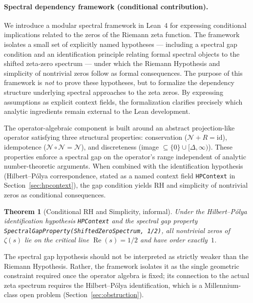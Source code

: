 \documentclass[12pt, a4paper]{article}
\theoremstyle{plain}
\newtheorem{theorem}{Theorem}[section]
\theoremstyle{definition}
\newcommand{\re}{\operatorname{Re}}
\newcommand{\lean}[1]{\texttt{#1}}
\newcommand{\Lean}{\textsf{Lean~4}}
\begin{document}
\paragraph{Spectral dependency framework (conditional contribution).}
We introduce a modular spectral framework in \Lean{} for expressing conditional
implications related to the zeros of the Riemann zeta function.
The framework isolates a small set of explicitly named hypotheses --- including a
spectral gap condition and an identification principle relating formal spectral
objects to the shifted zeta-zero spectrum --- under which the Riemann Hypothesis
and simplicity of nontrivial zeros follow as formal consequences.
The purpose of this framework is \emph{not} to prove these hypotheses, but to
formalize the dependency structure underlying spectral approaches to the zeta zeros.
By expressing assumptions as explicit context fields, the formalization clarifies
precisely which analytic ingredients remain external to the Lean development.

The operator-algebraic component is built around an abstract projection-like
operator satisfying three structural properties: conservation ($\mathcal{N} + R = \mathrm{id}$),
idempotence ($\mathcal{N} \circ \mathcal{N} = \mathcal{N}$), and discreteness
(image $\subseteq \{0\} \cup [\Delta, \infty)$).
These properties enforce a spectral gap on the operator's range independent of
analytic number-theoretic arguments.
When combined with the identification hypothesis (Hilbert--P\'{o}lya correspondence,
stated as a named context field \lean{HPContext} in Section~\ref{sec:hpcontext}),
the gap condition yields RH and simplicity of nontrivial zeros as conditional consequences.

\begin{theorem}[Conditional RH and Simplicity, informal]
\label{thm:conditional_rh}
Under the Hilbert--P\'{o}lya identification hypothesis \lean{HPContext} and the
spectral gap property \lean{SpectralGapProperty(ShiftedZeroSpectrum, 1/2)},
all nontrivial zeros of $\zeta(s)$ lie on the critical line $\re(s) = 1/2$
and have order exactly~$1$.
\end{theorem}

\noindent
The spectral gap hypothesis should not be interpreted as strictly weaker than
the Riemann Hypothesis.
Rather, the framework isolates it as the single geometric constraint required
once the operator algebra is fixed; its connection to the actual zeta spectrum
requires the Hilbert--P\'{o}lya identification, which is a Millennium-class
open problem (Section~\ref{sec:obstruction}).
\end{document}
